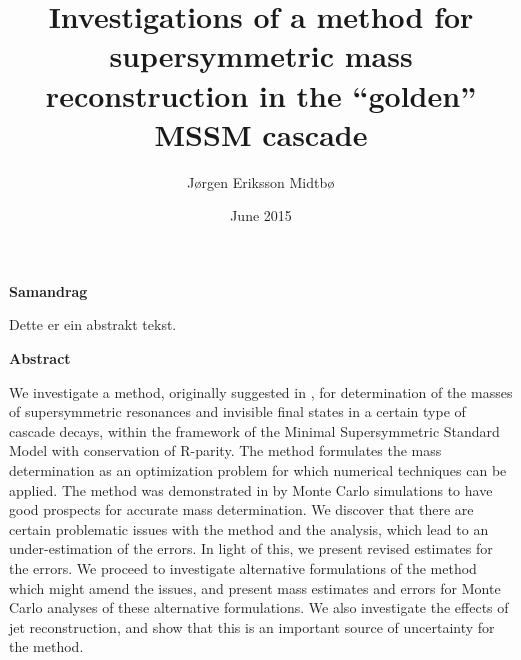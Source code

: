 \documentclass[twoside,english]{uiofysmaster}
\author{J\o rgen Eriksson Midtb\o}
\title{Investigations of a method for supersymmetric mass reconstruction in the ``golden'' MSSM cascade}
\date{June 2015}
\newenvironment{abstractpage}
  {\cleardoublepage\vspace*{\fill}\thispagestyle{empty}}
  {\vfill\cleardoublepage}
\renewenvironment{abstract}[1]
  {\bigskip\selectlanguage{#1}%
   }
  {\par\bigskip}
\begin{document}

\cleardoublepage

\begin{abstractpage}

\begin{center}
	\textbf{Samandrag}
\end{center}
\begin{abstract}{norsk}
    Dette er ein abstrakt tekst.
\end{abstract}

\begin{center}
	\textbf{Abstract}
\end{center}
\begin{abstract}{english}
    We investigate a method, originally suggested in \cite{Webber:2009vm}, for determination of the masses of supersymmetric resonances and invisible final states in a certain type of cascade decays, within the framework of the Minimal Supersymmetric Standard Model with conservation of R-parity. The method formulates the mass determination as an optimization problem for which numerical techniques can be applied. The method was demonstrated in \cite{Webber:2009vm} by Monte Carlo simulations to have good prospects for accurate mass determination. We discover that there are certain problematic issues with the method and the analysis, which lead to an under-estimation of the errors. In light of this, we present revised estimates for the errors. We proceed to investigate alternative formulations of the method which might amend the issues, and present mass estimates and errors for Monte Carlo analyses of these alternative formulations. We also investigate the effects of jet reconstruction, and show that this is an important source of uncertainty for the method. 
\end{abstract}

\end{abstractpage}


\begin{dedication}
\end{dedication}

\end{document}
